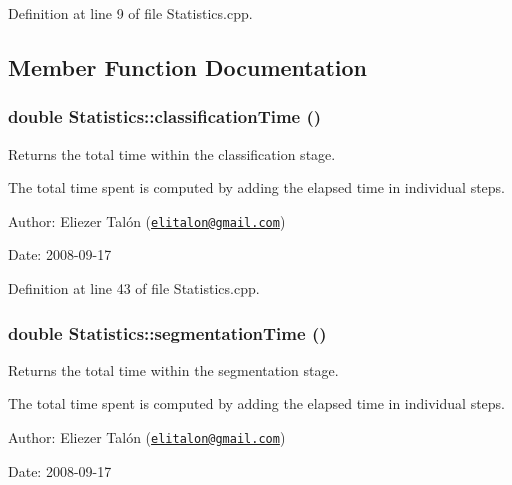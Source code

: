 Definition at line 9 of file Statistics.cpp.

\subsection{Member Function Documentation}
\hypertarget{class_statistics_5ed76fbaac7463ebe6ba9f240b33c0eb}{
\subsubsection[classificationTime]{\setlength{\rightskip}{0pt plus 5cm}double Statistics::classificationTime ()}}
\label{class_statistics_5ed76fbaac7463ebe6ba9f240b33c0eb}


Returns the total time within the classification stage. 

The total time spent is computed by adding the elapsed time in individual steps.

\begin{Desc}
\item[Author:]Eliezer Talón (\href{mailto:elitalon@gmail.com}{\tt elitalon@gmail.com}) \end{Desc}
\begin{Desc}
\item[Date:]2008-09-17 \end{Desc}


Definition at line 43 of file Statistics.cpp.\hypertarget{class_statistics_d0df3ef2d73687b6dc3f85a55439ae16}{
\subsubsection[segmentationTime]{\setlength{\rightskip}{0pt plus 5cm}double Statistics::segmentationTime ()}}
\label{class_statistics_d0df3ef2d73687b6dc3f85a55439ae16}


Returns the total time within the segmentation stage. 

The total time spent is computed by adding the elapsed time in individual steps.

\begin{Desc}
\item[Author:]Eliezer Talón (\href{mailto:elitalon@gmail.com}{\tt elitalon@gmail.com}) \end{Desc}
\begin{Desc}
\item[Date:]2008-09-17 \end{Desc}


